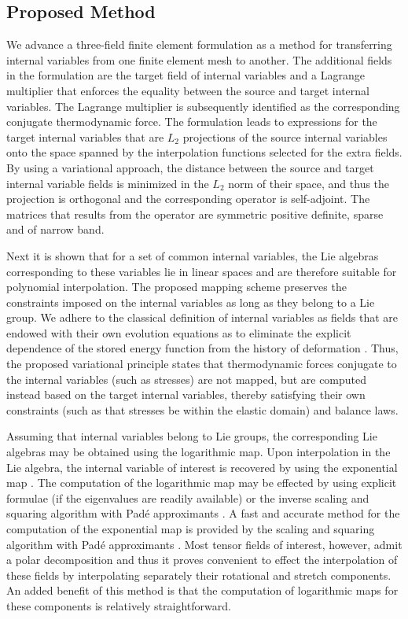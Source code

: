\documentclass[12pt]{article}
\begin{document}
\subsection{Proposed Method}

We advance a three-field finite element formulation as a method for transferring
internal variables from one finite element mesh to another. The additional
fields in the formulation are the target field of internal variables and a
Lagrange multiplier that enforces the equality between the source and target
internal variables. The Lagrange multiplier is subsequently identified as the
corresponding conjugate thermodynamic force. The formulation leads to
expressions for the target internal variables that are $L_2$ projections of the
source internal variables onto the space spanned by the interpolation functions
selected for the extra fields. By using a variational approach, the distance
between the source and target internal variable fields is minimized in the $L_2$
norm of their space, and thus the projection is orthogonal and the corresponding
operator is self-adjoint. The matrices that results from the operator are
symmetric positive definite, sparse and of narrow band.

Next it is shown that for a set of common internal variables, the Lie algebras
corresponding to these variables lie in linear spaces and are therefore suitable
for polynomial interpolation.  The proposed mapping scheme preserves the
constraints imposed on the internal variables as long as they belong to a Lie
group. We adhere to the classical definition of internal variables as fields
that are endowed with their own evolution equations as to eliminate the explicit
dependence of the stored energy function from the history of deformation
\citep{Muschik:2001, Antman:2005}. Thus, the proposed variational principle
states that thermodynamic forces conjugate to the internal variables (such as
stresses) are not mapped, but are computed instead based on the target internal
variables, thereby satisfying their own constraints (such as that stresses be
within the elastic domain) and balance laws.

Assuming that internal variables belong to Lie groups, the corresponding Lie
algebras may be obtained using the logarithmic map. Upon interpolation in the
Lie algebra, the internal variable of interest is recovered by using the
exponential map \citep{Marsden.Ratiu:1999, Sepanski:2007,
Kosmann-Schwarzbach:2009,
  Gallier:2011}. The computation of the logarithmic map may be
effected by using explicit formulae (if the eigenvalues are readily available)
\citep{Jog:2008} or the inverse scaling and squaring algorithm with Pad\'e
approximants \citep{Cheng.etal:2001,
  Davies.Higham:2003}.  A fast and accurate method for the computation
of the exponential map is provided by the scaling and squaring algorithm with
Pad\'e approximants \citep{Higham:2001,Higham:2005}. Most tensor fields of
interest, however, admit a polar decomposition and thus it proves convenient to
effect the interpolation of these fields by interpolating separately their
rotational and stretch components. An added benefit of this method is that the
computation of logarithmic maps for these components is relatively
straightforward.
\end{document}
